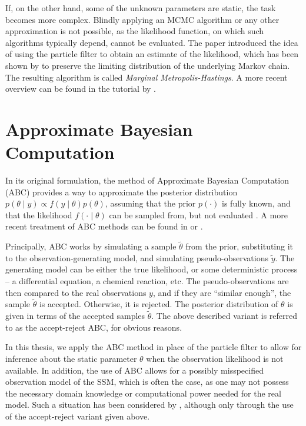 If, on the other hand, some of the unknown parameters are static, the task becomes more complex. Blindly applying an MCMC algorithm or any other approximation is not possible, as the likelihood function, on which such algorithms typically depend, cannot be evaluated. The paper \cite{andrieu} introduced the idea of using the particle filter to obtain an estimate of the likelihood, which has been shown by \cite{del-moral} to preserve the limiting distribution of the underlying Markov chain. The resulting algorithm is called \textit{Marginal Metropolis-Hastings}. A more recent overview can be found in the tutorial by \cite{schoen}.

\section{Approximate Bayesian Computation}
In its original formulation, the method of Approximate Bayesian Computation (ABC) provides a way to approximate the posterior distribution $p(\theta \mid y) \propto f(y \mid \theta) p(\theta)$, assuming that the prior $p(\cdot)$ is fully known, and that the likelihood $f(\cdot \mid \theta)$ can be sampled from, but not evaluated \citep{abc-old-old, abc-old}. A more recent treatment of ABC methods can be found in \cite{abc-recent} or \cite{abc-super-recent}.

Principally, ABC works by simulating a sample $\tilde{\theta}$ from the prior, substituting it to the observation-generating model, and simulating pseudo-observations $\tilde{y}$. The generating model can be either the true likelihood, or some deterministic process -- a differential equation, a chemical reaction, etc. The pseudo-observations are then compared to the real observations $y$, and if they are ``similar enough'', the sample $\tilde{\theta}$ is accepted. Otherwise, it is rejected. The posterior distribution of $\theta$ is given in terms of the accepted samples $\tilde{\theta}$. The above described variant is referred to as the accept-reject ABC, for obvious reasons.

In this thesis, we apply the ABC method in place of the particle filter to allow for inference about the static parameter $\theta$ when the observation likelihood is not available. In addition, the use of ABC allows for a possibly misspecified observation model of the SSM, which is often the case, as one may not possess the necessary domain knowledge or computational power needed for the real model. Such a situation has been considered by \cite{jasra-time-series}, although only through the use of the accept-reject variant given above.

